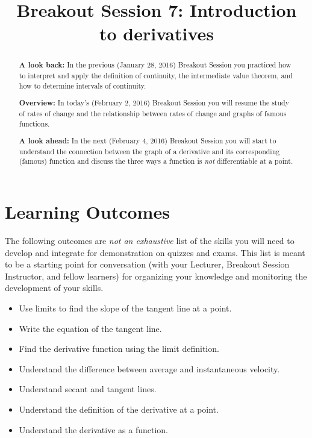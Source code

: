 \documentclass[handout,nooutcomes]{ximera}
\title{Breakout Session 7: Introduction to derivatives}
\begin{document}
\begin{abstract}
  \textbf{A look back:} In the previous (January 28, 2016) Breakout Session you practiced how to interpret and apply the definition of continuity, the intermediate value theorem, and how to determine intervals of continuity.

  \textbf{Overview:} In today's (February 2, 2016) Breakout Session you will resume the study of rates of change and the relationship between rates of change and graphs of famous functions.

  \textbf{A look ahead:} In the next (February 4, 2016) Breakout Session you will start to understand the connection between the graph of a derivative and its corresponding (famous) function and discuss the three ways a function is \emph{not} differentiable at a point.
\end{abstract}
\maketitle

\section{Learning Outcomes}
\label{section:learning-outcomes}
The following outcomes are \emph{not an exhaustive} list of the skills you will need to develop and integrate for demonstration on quizzes and exams.
This list is meant to be a starting point for conversation (with your Lecturer, Breakout Session Instructor, and fellow learners) for organizing your knowledge and monitoring the development of your skills.
\begin{itemize}
  \item
    Use limits to find the slope of the tangent line at a point.

  \item
    Write the equation of the tangent line.
    
  \item
    Find the derivative function using the limit definition.

  \item
    Understand the difference between average and instantaneous velocity.

  \item
    Understand secant and tangent lines.

  \item
    Understand the definition of the derivative at a point. 

  \item 
    Understand the derivative as a function. 
\end{itemize}
\end{document}
